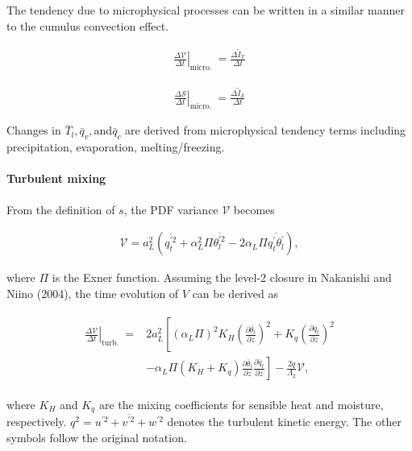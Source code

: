 The tendency due to microphysical processes can be written in a similar
manner to the cumulus convection effect.

\begin{eqnarray}
\left.\frac{\Delta \mathcal{V}}{\Delta t}\right|_{\text {micro. }}=\frac{\Delta \tilde{I}_{\mathcal{V}}}{\Delta t}
\end{eqnarray}

\begin{eqnarray}
\left.\frac{\Delta \mathcal{S}}{\Delta t}\right|_{\text {micro. }}=\frac{\Delta \tilde{I}_{\mathcal{S}}}{\Delta t}
\end{eqnarray}

Changes in \(\bar{T}_{l}, \bar{q}_{v}, \text{and} \bar{q}_{c}\) are
derived from microphysical tendency terms including precipitation,
evaporation, melting/freezing.

\hypertarget{turbulent-mixing}{%
\paragraph{Turbulent mixing}\label{turbulent-mixing}}

From the definition of \(s\), the PDF variance \(\mathcal{V}\) becomes

\begin{eqnarray}
\mathcal{V}=a_{L}^{2}\left(\overline{q_{t}^{\prime 2}}+\alpha_{L}^{2} \Pi \overline{\theta_{l}^{\prime 2}}-2 \alpha_{L} \Pi \overline{q_{t}^{\prime} \theta_{l}^{\prime}}\right),
\end{eqnarray}

where \(\Pi\) is the Exner function. Assuming the level-2 closure in
Nakanishi and Niino (2004), the time evolution of \(V\) can be derived
as

\begin{eqnarray}
\begin{aligned}
\left.\frac{\Delta \mathcal{V}}{\Delta t}\right|_{\text {turb. }}=& 2 a_{L}^{2}\left[\left(\alpha_{L} \Pi\right)^{2} K_{H}\left(\frac{\partial \bar{\theta}_{l}}{\partial z}\right)^{2}+K_{q}\left(\frac{\partial \bar{q}_{t}}{\partial z}\right)^{2}\right.\\
&\left.-\alpha_{L} \Pi\left(K_{H}+K_{q}\right) \frac{\partial \bar{\theta}_{l}}{\partial z} \frac{\partial \bar{q}_{t}}{\partial z}\right]-\frac{2 q}{\Lambda_{2}} \mathcal{V},
\end{aligned}
\label{W09-28}
\end{eqnarray}

where \(K_H\) and \(K_q\) are the mixing coefficients for sensible heat
and moisture, respectively.
\(q^{2}=\overline{u^{\prime 2}+v^{\prime 2}+w^{\prime 2}}\) denotes the
turbulent kinetic energy. The other symbols follow the original
notation.

